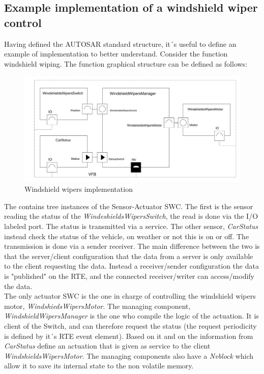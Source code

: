 \documentclass[../main.tex]{subfiles}
\begin{document}
\subsection{Example implementation of a windshield wiper control}
Having defined the \gls{AUTOSAR} standard structure, it´s useful to define an example of implementation to better understand. Consider the function windshield wiping. The function graphical structure can be defined as follows:
\begin{figure}[H]
    \centering
    \includegraphics[width=\linewidth]{images_folder/windshield_WIpers_aUtosar.jpeg}
    \caption{Windshield wipers implementation}
    \label{fig:WINWIP}
\end{figure}
The contains tree instances of the Sensor-Actuator \gls{SWC}. The first is the sensor reading the status of the \textit{WindeshieldsWipersSwitch}, the read is done via the \gls{I/O} labeled port. The status is transmitted via a service. The other sensor, \textit{CarStatus} instead check the status of the vehicle, on weather or not this is on or off. The transmission is done via a sender receiver. The main difference between the two is that the server/client configuration that the data from a server is only available to the client requesting the data. Instead a receiver/sender configuration the data is "published" on the \gls{RTE}, and the connected receiver/writer can access/modify the data.\\
The only actuator \gls{SWC} is the one in charge of controlling the windshield wipers motor, \textit{WindshiedsWipersMotor}. The managing component, \textit{WindshieldWipersManager} is the one who compile the logic of the actuation. It is client of the Switch, and can therefore request the status (the request periodicity is defined by it´s RTE event element). Based on it and on the information from \textit{CarStatus} define an actuation that is given as service to the client \textit{WindshieldsWipersMotor}. The managing components also have a \textit{Nvblock} which allow it to save its internal state to the non volatile memory. 
\end{document}
